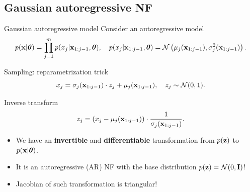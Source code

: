 \subsection{Gaussian autoregressive NF}
\begin{frame}{Gaussian autoregressive model}
	Consider an autoregressive model
	\vspace{-0.3cm}
	{\small
		\[
		p(\mathbf{x} | \boldsymbol{\theta}) = \prod_{j=1}^m p(x_j | \mathbf{x}_{1:j - 1}, \boldsymbol{\theta}), \quad
		p(x_j | \mathbf{x}_{1:j - 1}, \boldsymbol{\theta}) = \mathcal{N} \left(\mu_j(\mathbf{x}_{1:j-1}), \sigma^2_j (\mathbf{x}_{1:j-1})\right).
		\]
	}
	\vspace{-0.5cm}
	\begin{block}{Sampling: reparametrization trick}
		\vspace{-0.3cm}
		\[
		x_j = \sigma_j (\mathbf{x}_{1:j-1}) \cdot z_j + \mu_j(\mathbf{x}_{1:j-1}), \quad z_j \sim \mathcal{N}(0, 1).
		\]
		\vspace{-0.7cm}
	\end{block}
	\begin{block}{Inverse transform}
		\vspace{-0.3cm}
		\[
		z_j = \left(x_j - \mu_j(\mathbf{x}_{1:j-1}) \right) \cdot \frac{1}{\sigma_j (\mathbf{x}_{1:j-1}) }.
		\]
		\vspace{-0.4cm}
	\end{block}
	\begin{itemize}
		\item We have an \textbf{invertible} and \textbf{differentiable} transformation from $p(\mathbf{z})$ to $p(\mathbf{x} | \boldsymbol{\theta})$.
		\item It is an autoregressive (AR) NF with the base distribution $p(\mathbf{z}) = \mathcal{N}(0, \mathbf{I})$!
		\item Jacobian of such transformation is triangular!
	\end{itemize}
\end{frame}
